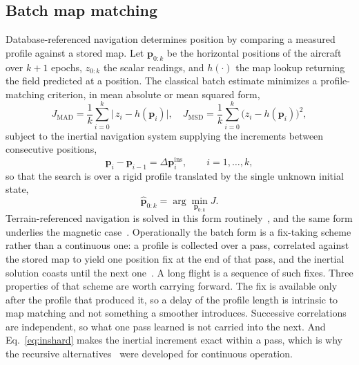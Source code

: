 \documentclass{IEEEtaes}
\begin{document}
\subsection{Batch map matching}\label{sec:batchmm}
Database-referenced navigation determines position by comparing a measured
profile against a stored map. Let $\mathbf{p}_{0:k}$ be the horizontal positions
of the aircraft over $k+1$ epochs, $z_{0:k}$ the scalar readings, and
$h(\cdot)$ the map lookup returning the field predicted at a position. The
classical batch estimate minimizes a profile-matching criterion, in mean
absolute or mean squared form,
\begin{equation}
J_{\mathrm{MAD}}=\frac{1}{k}\sum_{i=0}^{k}\big|\,z_i-h(\mathbf{p}_i)\big|,
\quad
J_{\mathrm{MSD}}=\frac{1}{k}\sum_{i=0}^{k}\big(z_i-h(\mathbf{p}_i)\big)^{2},
\label{eq:mad}
\end{equation}
subject to the inertial navigation system supplying the increments between
consecutive positions,
\begin{equation}
\mathbf{p}_i-\mathbf{p}_{i-1}=\Delta\mathbf{p}^{\mathrm{ins}}_i,
\qquad i=1,\dots,k,
\label{eq:inshard}
\end{equation}
so that the search is over a rigid profile translated by the single unknown
initial state,
\begin{equation}
\hat{\mathbf{p}}_{0:k}=\arg\min_{\mathbf{p}_{0:k}} J .
\label{eq:batchmm}
\end{equation}
Terrain-referenced navigation is solved in this form
routinely~\cite{hollowell1990,cowie2008}, and the same form underlies the
magnetic case~\cite{canciani2016,canciani2017}. Operationally the batch form
is a fix-taking scheme rather than a continuous one: a profile is collected
over a pass, correlated against the stored map to yield one position fix at
the end of that pass, and the inertial solution coasts until the next
one~\cite{golden1980}. A long flight is a sequence of such fixes. Three
properties of that scheme are worth carrying forward. The fix is available
only after the profile that produced it, so a delay of the profile length is
intrinsic to map matching and not something a smoother introduces. Successive
correlations are independent, so what one pass learned is not carried into the
next. And Eq.~\eqref{eq:inshard} makes the inertial increment exact within a
pass, which is why the recursive alternatives~\cite{hostetler1983} were
developed for continuous operation.
\end{document}
